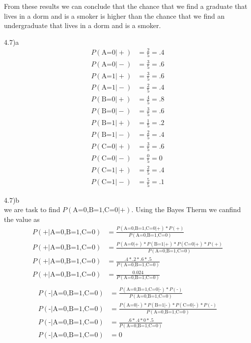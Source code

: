 \documentclass[12pt,english]{article}
\begin{document}
From these results we can conclude that the chance that we find a graduate that lives in a dorm and is a smoker is higher than the chance that we find an undergraduate that lives in a dorm and is a smoker.\par
4.7)a\\
\begin{equation}
\begin{split}
P(\mbox{A=0} \vert +) &= \frac{2}{5} = .4\\
P(\mbox{A=0} \vert -) &= \frac{3}{5} = .6\\
P(\mbox{A=1} \vert +) &= \frac{3}{5} = .6\\
P(\mbox{A=1} \vert -) &= \frac{2}{5} = .4\\
P(\mbox{B=0} \vert +) &= \frac{4}{5} = .8\\
P(\mbox{B=0} \vert -) &= \frac{3}{5} = .6\\
P(\mbox{B=1} \vert +) &= \frac{1}{5} = .2\\
P(\mbox{B=1} \vert -) &= \frac{2}{5} = .4\\
P(\mbox{C=0} \vert +) &= \frac{3}{5} = .6\\
P(\mbox{C=0} \vert -) &= \frac{0}{5} = 0\\
P(\mbox{C=1} \vert +) &= \frac{2}{5} = .4\\
P(\mbox{C=1} \vert -) &= \frac{5}{5} = .1
\end{split}
\end{equation}
\par
4.7)b\\
we are task to find $P(\mbox{A=0,B=1,C=0} \vert \mbox{+})$. Using the Bayes Therm we canfind the value as
\begin{equation}
\begin{split}
P(\mbox{+} \vert \mbox{A=0,B=1,C=0}) &= \frac{P(\mbox{A=0,B=1,C=0} \vert \mbox{+}) * P(\mbox{+})}{P(\mbox{A=0,B=1,C=0})}\\
P(\mbox{+} \vert \mbox{A=0,B=1,C=0}) &= \frac{P(\mbox{A=0} \vert \mbox{+}) * P(\mbox{B=1} \vert \mbox{+}) *P(\mbox{C=0} \vert \mbox{+}) * P(\mbox{+})}{P(\mbox{A=0,B=1,C=0})}\\
P(\mbox{+} \vert \mbox{A=0,B=1,C=0}) &= \frac{.4 * .2 *.6 * .5}{P(\mbox{A=0,B=1,C=0})}\\
P(\mbox{+} \vert \mbox{A=0,B=1,C=0}) &= \frac{0.024}{P(\mbox{A=0,B=1,C=0})}\\
\end{split}
\end{equation}
\begin{equation}
\begin{split}
P(\mbox{-} \vert \mbox{A=0,B=1,C=0}) &= \frac{P(\mbox{A=0,B=1,C=0} \vert \mbox{-}) * P(\mbox{-})}{P(\mbox{A=0,B=1,C=0})}\\
P(\mbox{-} \vert \mbox{A=0,B=1,C=0}) &= \frac{P(\mbox{A=0} \vert \mbox{-}) * P(\mbox{B=1} \vert \mbox{-}) *P(\mbox{C=0} \vert \mbox{-}) * P(\mbox{-})}{P(\mbox{A=0,B=1,C=0})}\\
P(\mbox{-} \vert \mbox{A=0,B=1,C=0}) &= \frac{.6 * .4 *0 * .5}{P(\mbox{A=0,B=1,C=0})}\\
P(\mbox{-} \vert \mbox{A=0,B=1,C=0}) &= 0\\
\end{split}
\end{equation}
\end{document}
